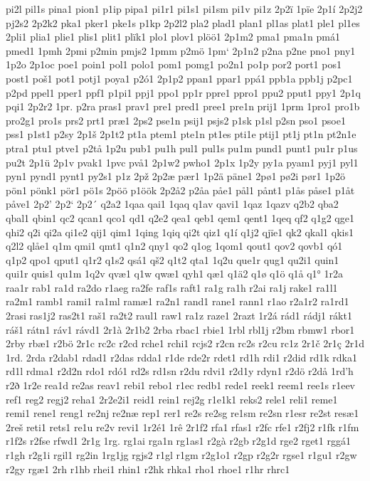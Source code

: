 pi2l
pil1s
pina1
pion1
p1ip
pipa1
pi1r1
pi1s1
pi1sm
pi1v
pi1z
2p2ï
1pïe
2p1í
2p2j2
pj2s2
2p2k2
pka1
pker1
pke1s
p1kp
2p2l2
pla2
plad1
plan1
pl1as
plat1
ple1
pl1es
2pli1
plia1
plie1
plis1
plit1
plïk1
plo1
plov1
plöö1
2p1m2
pma1
pma1n
pmá1
pmed1
1pmh
2pmi
p2min
pmjs2
1pmm
p2mö
1pm`
2p1n2
p2na
p2ne
pno1
pny1
1p2o
2p1oc
poe1
poin1
pol1
polo1
pom1
pomg1
po2n1
po1p
por2
port1
pos1
post1
poš1
pot1
potj1
poya1
p2ó1
2p1p2
ppan1
ppar1
ppá1
ppb1a
ppb1j
p2pc1
p2pd
ppel1
pper1
ppf1
p1pi1
ppj1
ppo1
pp1r
ppre1
ppro1
ppu2
pput1
ppy1
2p1q
pqi1
2p2r2
1pr.
p2ra
pras1
prav1
pre1
pred1
pree1
pre1n
prij1
1prm
1pro1
pro1b
pro2g1
pro1s
prs2
prt1
præ1
2ps2
pse1n
psij1
psjs2
p1sk
p1sl
p2sn
pso1
psoe1
pss1
p1st1
p2sy
2p1š
2p1t2
pt1a
ptem1
pte1n
pt1es
pti1e
ptij1
pt1j
pt1n
pt2n1e
ptra1
ptu1
ptve1
p2tå
1p2u
pub1
pu1h
pul1
pul1s
pu1m
pund1
punt1
pu1r
p1us
pu2t
2p1ü
2p1v
pvak1
1pvc
pvå1
2p1w2
pwho1
2p1x
1p2y
py1a
pyam1
pyj1
pyl1
pyn1
pynd1
pynt1
py2s1
p1z
2pž
2p2æ
pær1
1p2ä
päne1
2pø1
pø2i
pør1
1p2ö
pön1
pönk1
pör1
pö1s
2pöö
p1öök
2p2å2
p2åa
påe1
pål1
pånt1
p1ås
påse1
p1åt
påve1
2p2'
2p2`
2p2´
q2a2
1qaa
qai1
1qaq
q1av
qavi1
1qaz
1qazv
q2b2
qba2
qbal1
qbin1
qc2
qcan1
qco1
qd1
q2e2
qea1
qeb1
qem1
qent1
1qeq
qf2
q1g2
qge1
qhi2
q2i
qi2a
qi1e2
qij1
qim1
1qing
1qiq
qi2t
qiz1
q1í
q1j2
qjïe1
qk2
qkal1
qkis1
q2l2
qlåe1
q1m
qmi1
qmt1
q1n2
qny1
qo2
q1og
1qom1
qout1
qov2
qovb1
qó1
q1p2
qpo1
qput1
q1r2
q1s2
qsá1
qš2
q1t2
qta1
1q2u
que1r
qug1
qu2i1
quin1
qui1r
quis1
qu1m
1q2v
qvæ1
q1w
qwæ1
qyh1
qæ1
q1ä2
q1ø
q1ö
q1å
q1°
1r2a
raa1r
rab1
ra1d
ra2do
r1aeg
ra2fe
raf1s
raft1
ra1g
ra1h
r2ai
ra1j
rake1
ra1l1
ra2m1
ramb1
rami1
ra1ml
ramæ1
ra2n1
rand1
rane1
rann1
r1ao
r2a1r2
ra1rd1
2rasi
ras1j2
ras2t1
raš1
ra2t2
raul1
raw1
ra1z
raze1
2razt
1r2á
rád1
rádj1
rákt1
ráš1
rátn1
ráv1
rávd1
2r1à
2r1b2
2rba
rbac1
rbie1
1rbl
rbl1j
r2bm
rbmw1
rbor1
2rby
rbæ1
r2bö
2r1c
rc2c
r2cd
rche1
rchi1
rcjs2
r2cn
rc2s
r2cu
rc1z
2r1č
2r1ç
2r1d
1rd.
2rda
r2dab1
rdad1
r2das
rdda1
r1de
rde2r
rdet1
rd1h
rdi1
r2did
rd1k
rdka1
rd1l
rdma1
r2d2n
rdo1
rdó1
rd2s
rd1sn
r2du
rdvi1
r2d1y
rdyn1
r2dö
r2då
1rd'h
r2ð
1r2e
rea1d
re2as
reav1
rebi1
rebo1
r1ec
redb1
rede1
reek1
reem1
ree1s
r1eev
ref1
reg2
regj2
reha1
2r2e2i1
reid1
rein1
rej2g
r1e1k1
reks2
rele1
reli1
reme1
remi1
rene1
reng1
re2nj
re2næ
rep1
rer1
re2s
re2sg
re1sm
re2sn
r1esr
re2st
resæ1
2reš
reti1
rets1
re1u
re2v
revi1
1r2é1
1rê
2r1f2
rfa1
rfas1
r2fc
rfe1
r2fj2
r1fk
r1fm
r1f2s
r2fse
rfwd1
2r1g
1rg.
rg1ai
rga1n
rg1as1
r2gà
r2gb
r2g1d
rge2
rget1
rggá1
r1gh
r2g1i
rgil1
rg2in
1rg1jg
rgjs2
r1gl
r1gm
r2g1o1
r2gp
r2g2r
rgse1
r1gu1
r2gw
r2gy
rgæ1
2rh
r1hb
rhei1
rhin1
r2hk
rhka1
rho1
rhoe1
r1hr
rhrc1
